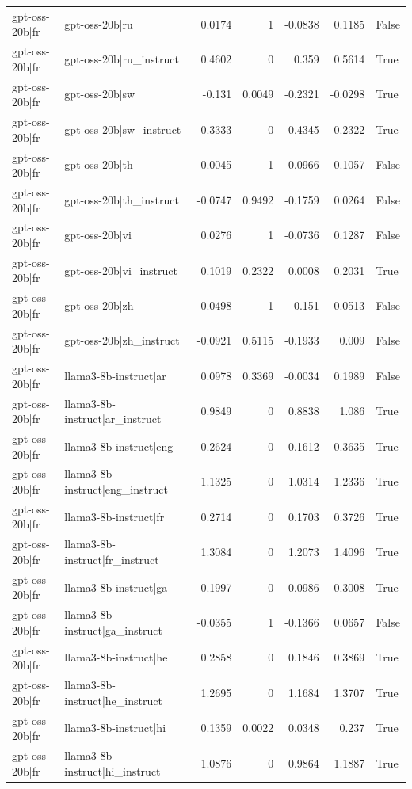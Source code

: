 \begin{table}
\begin{tabular}{l l r r r r l}
gpt-oss-20b|fr & gpt-oss-20b|ru & 0.0174 & 1 & -0.0838 & 0.1185 & False \\
gpt-oss-20b|fr & gpt-oss-20b|ru_instruct & 0.4602 & 0 & 0.359 & 0.5614 & True \\
gpt-oss-20b|fr & gpt-oss-20b|sw & -0.131 & 0.0049 & -0.2321 & -0.0298 & True \\
gpt-oss-20b|fr & gpt-oss-20b|sw_instruct & -0.3333 & 0 & -0.4345 & -0.2322 & True \\
gpt-oss-20b|fr & gpt-oss-20b|th & 0.0045 & 1 & -0.0966 & 0.1057 & False \\
gpt-oss-20b|fr & gpt-oss-20b|th_instruct & -0.0747 & 0.9492 & -0.1759 & 0.0264 & False \\
gpt-oss-20b|fr & gpt-oss-20b|vi & 0.0276 & 1 & -0.0736 & 0.1287 & False \\
gpt-oss-20b|fr & gpt-oss-20b|vi_instruct & 0.1019 & 0.2322 & 0.0008 & 0.2031 & True \\
gpt-oss-20b|fr & gpt-oss-20b|zh & -0.0498 & 1 & -0.151 & 0.0513 & False \\
gpt-oss-20b|fr & gpt-oss-20b|zh_instruct & -0.0921 & 0.5115 & -0.1933 & 0.009 & False \\
gpt-oss-20b|fr & llama3-8b-instruct|ar & 0.0978 & 0.3369 & -0.0034 & 0.1989 & False \\
gpt-oss-20b|fr & llama3-8b-instruct|ar_instruct & 0.9849 & 0 & 0.8838 & 1.086 & True \\
gpt-oss-20b|fr & llama3-8b-instruct|eng & 0.2624 & 0 & 0.1612 & 0.3635 & True \\
gpt-oss-20b|fr & llama3-8b-instruct|eng_instruct & 1.1325 & 0 & 1.0314 & 1.2336 & True \\
gpt-oss-20b|fr & llama3-8b-instruct|fr & 0.2714 & 0 & 0.1703 & 0.3726 & True \\
gpt-oss-20b|fr & llama3-8b-instruct|fr_instruct & 1.3084 & 0 & 1.2073 & 1.4096 & True \\
gpt-oss-20b|fr & llama3-8b-instruct|ga & 0.1997 & 0 & 0.0986 & 0.3008 & True \\
gpt-oss-20b|fr & llama3-8b-instruct|ga_instruct & -0.0355 & 1 & -0.1366 & 0.0657 & False \\
gpt-oss-20b|fr & llama3-8b-instruct|he & 0.2858 & 0 & 0.1846 & 0.3869 & True \\
gpt-oss-20b|fr & llama3-8b-instruct|he_instruct & 1.2695 & 0 & 1.1684 & 1.3707 & True \\
gpt-oss-20b|fr & llama3-8b-instruct|hi & 0.1359 & 0.0022 & 0.0348 & 0.237 & True \\
gpt-oss-20b|fr & llama3-8b-instruct|hi_instruct & 1.0876 & 0 & 0.9864 & 1.1887 & True \\

\end{tabular}
\end{table}
